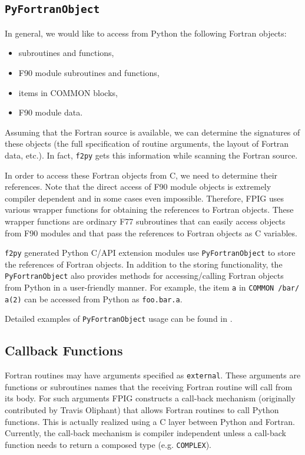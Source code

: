 \documentclass[twocolumn]{article}
\newcommand{\fpy}{\texttt{f2py}\xspace}
\begin{document}
\subsection{\texttt{PyFortranObject}}
\label{sec:PFO}

In general, we would like to access from Python the following Fortran
objects:
\begin{itemize}
\item subroutines and functions,
\item F90 module subroutines and functions,
\item items in COMMON blocks,
\item F90 module data.
\end{itemize}
Assuming that the Fortran source is available, we can determine the signatures
of these objects (the full specification of routine arguments, the
layout of Fortran data, etc.).  In fact, \fpy gets this information
while scanning the Fortran source.

In order to access these Fortran objects from C, we need to determine
their references. Note that the direct access of F90 module objects is
extremely compiler dependent and in some cases even impossible.
Therefore, FPIG uses various wrapper functions for obtaining the
references to Fortran objects. These wrapper functions are ordinary
F77 subroutines that can easily access objects from F90 modules and
that pass the references to Fortran objects as C variables.


\fpy generated Python C/API extension modules use
\texttt{PyFortranObject} to store the references of Fortran objects.
In addition to the storing functionality, the \texttt{PyFortranObject}
also provides methods for accessing/calling Fortran objects from
Python in a user-friendly manner. For example, the item \texttt{a} in
\texttt{COMMON /bar/ a(2)} can be accessed from Python as
\texttt{foo.bar.a}.

Detailed examples of \texttt{PyFortranObject} usage can be found in
\cite{PFO}.

\subsection{Callback Functions}
\label{sec:callback}

Fortran routines may have arguments specified as \texttt{external}.
These arguments are functions or subroutines names that the receiving Fortran routine
will call from its body. For such arguments FPIG
constructs a call-back mechanism (originally contributed by Travis
Oliphant) that allows Fortran routines to call Python functions. This
is actually realized using a C layer between Python and
Fortran. Currently, the call-back mechanism is compiler independent
unless a call-back function needs to return a composed type
(e.g. \texttt{COMPLEX}).
\end{document}
